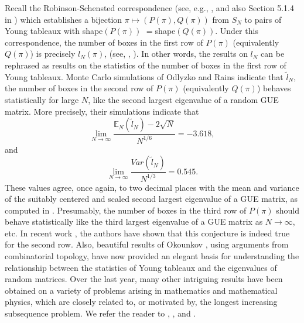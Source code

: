 \documentclass{amsart}
\theoremstyle{definition}
\theoremstyle{remark}
\numberwithin{equation}{section}
\newcommand{\E}{\mathbb E}
\newcommand{\wt}{\widetilde}
\begin{document}
Recall the Robinson-Schensted correspondence 
(see, e.g., \cite{Sa}, and also Section 5.1.4 in \cite{Kn}) 
which establishes a bijection $\pi\mapsto (P(\pi),Q(\pi))$ from $S_N$ 
to pairs of Young tableaux with shape$(P(\pi))$  $=$shape$(Q(\pi))$. 
Under this correspondence, the number of boxes in the first row 
of $P(\pi)$ (equivalently $Q(\pi)$) is precisely $l_N(\pi)$, 
(see, \cite{Sa}, \cite{Kn}).
In other words, the results on $l_N$ can be rephrased as results on  
the statistics of the number of boxes in the first row of Young tableaux.
Monte Carlo simulations of Odlyzko and Rains \cite{OR} indicate that $\wt{l}_N$, 
the number of boxes in the second row of $P(\pi)$ 
(equivalently $Q(\pi)$) behaves 
statistically for large $N$, like the second largest eigenvalue of a 
random GUE matrix.
More precisely, their simulations indicate that 
\begin{equation*}
   \lim_{N\to\infty} \frac{\E_N(\wt{l}_N)-2\sqrt{N}}{N^{1/6}}
=-3.618, 
\end{equation*}
and 
\begin{equation*}
   \lim_{N\to\infty} \frac{Var(\wt{l}_N)}{N^{1/3}} = 0.545.
\end{equation*}
These values agree, once again, to two decimal places with 
the mean and variance of the suitably centered 
and scaled second largest eigenvalue of a GUE matrix, 
as computed in \cite{TW}.
Presumably, the number of boxes in the third row of $P(\pi)$ should 
behave statistically like the third largest eigenvalue of a GUE matrix 
as $N\to\infty$, etc. 
In recent work \cite{BDJ}, the authors have shown that this 
conjecture is indeed true for the second row.
Also, beautiful results of Okounkov \cite{Ok}, 
using arguments from combinatorial topology, have now provided an elegant 
basis for understanding the relationship between the statistics 
of Young tableaux and the eigenvalues of random matrices.
Over the last year, many other intriguing results have been obtained 
on a variety of problems arising in mathematics and mathematical 
physics, which are closely related to, or motivated by, 
the longest increasing subsequence problem. 
We refer the reader to 
\cite{TW2}, \cite{Bo}, \cite{Jo2, Jo3} and \cite{BR}.
\end{document}
